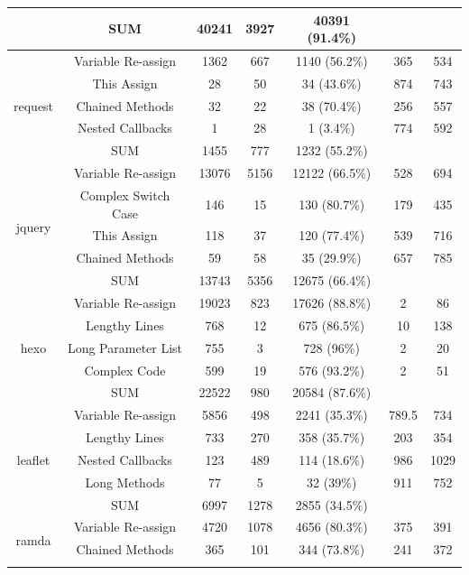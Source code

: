 \documentclass[smallcondensed]{svjour3}
\begin{document}
\begin{table}[!htbp]
{\begin{tabular}{c|c|c|c|c|c|c}
		& SUM & 40241 & 3927 & 40391 (91.4\%) & & \\ \hline
		\multirow{5}{*}{request}
		& Variable Re-assign & 1362 & 667 & 1140 (56.2\%) & 365 & 534 \\ \cline{2-7}
		& This Assign & 28 & 50 & 34 (43.6\%) & 874 & 743 \\ \cline{2-7}
		& Chained Methods & 32 & 22 & 38 (70.4\%) & 256 & 557 \\ \cline{2-7}
		& Nested Callbacks & 1 & 28 & 1 (3.4\%) & 774 & 592 \\ \cline{2-7}
		& SUM & 1455 & 777 & 1232 (55.2\%) & & \\ \hline
		\multirow{5}{*}{jquery}
		& Variable Re-assign & 13076 & 5156 & 12122 (66.5\%) & 528 & 694 \\ \cline{2-7}
		& Complex Switch Case & 146 & 15 & 130 (80.7\%) & 179 & 435 \\ \cline{2-7}
		& This Assign & 118 & 37 & 120 (77.4\%) & 539 & 716 \\ \cline{2-7}
		& Chained Methods & 59 & 58 & 35 (29.9\%) & 657 & 785 \\ \cline{2-7}
		& SUM & 13743 & 5356 & 12675 (66.4\%) & & \\ \hline
		\multirow{5}{*}{hexo}
		& Variable Re-assign & 19023 & 823 & 17626 (88.8\%) & 2 & 86 \\ \cline{2-7}
		& Lengthy Lines & 768 & 12 & 675 (86.5\%) & 10 & 138 \\ \cline{2-7}
		& Long Parameter List & 755 & 3 & 728 (96\%) & 2 & 20 \\ \cline{2-7}
		& Complex Code & 599 & 19 & 576 (93.2\%) & 2 & 51 \\ \cline{2-7}
		& SUM & 22522 & 980 & 20584 (87.6\%) & & \\ \hline
		\multirow{5}{*}{leaflet}
		& Variable Re-assign & 5856 & 498 & 2241 (35.3\%) & 789.5 & 734 \\ \cline{2-7}
		& Lengthy Lines & 733 & 270 & 358 (35.7\%) & 203 & 354 \\ \cline{2-7}
		& Nested Callbacks & 123 & 489 & 114 (18.6\%) & 986 & 1029 \\ \cline{2-7}
		& Long Methods & 77 & 5 & 32 (39\%) & 911 & 752 \\ \cline{2-7}
		& SUM & 6997 & 1278 & 2855 (34.5\%) & & \\ \hline
		\multirow{5}{*}{ramda}
		& Variable Re-assign & 4720 & 1078 & 4656 (80.3\%) & 375 & 391 \\ \cline{2-7}
		& Chained Methods & 365 & 101 & 344 (73.8\%) & 241 & 372 \\ \cline{2-7}

\end{tabular}}
\end{table}
\end{document}
